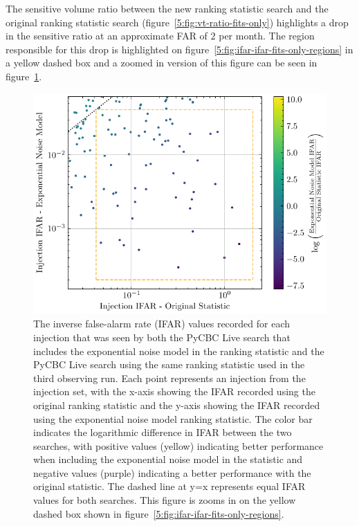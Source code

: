 The sensitive volume ratio between the new ranking statistic search and the original ranking statistic search (figure~\ref{5:fig:vt-ratio-fits-only}) highlights a drop in the sensitive ratio at an approximate FAR of $2$ per month. The region responsible for this drop is highlighted on figure~\ref{5:fig:ifar-ifar-fits-only-regions} in a yellow dashed box and a zoomed in version of this figure can be seen in figure~\ref{5:fig:bottom-left-region}.
%
\begin{figure}
    \centering
    \includegraphics[width=1\textwidth]{images/5_pycbclive/regions/fits_only_ifar_vs_ifar_bottom_left_region.pdf}
    \caption{The inverse false-alarm rate (IFAR) values recorded for each injection that was seen by both the PyCBC Live search that includes the exponential noise model in the ranking statistic and the PyCBC Live search using the same ranking statistic used in the third observing run. Each point represents an injection from the injection set, with the x-axis showing the IFAR recorded using the original ranking statistic and the y-axis showing the IFAR recorded using the exponential noise model ranking statistic. The color bar indicates the logarithmic difference in IFAR between the two searches, with positive values (yellow) indicating better performance when including the exponential noise model in the statistic and negative values (purple) indicating a better performance with the original statistic. The dashed line at y=x represents equal IFAR values for both searches. This figure is zooms in on the yellow dashed box shown in figure~\ref{5:fig:ifar-ifar-fits-only-regions}.}
    \label{5:fig:bottom-left-region}
\end{figure}
